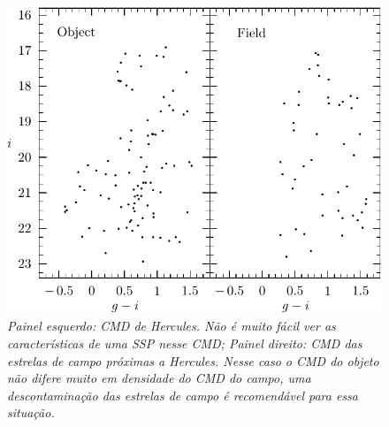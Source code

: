 \documentclass[
	12pt,				%
	openany,			%
	oneside,			%
	a4paper,			%
	english,			%
	brazil				%
	]{abntex2}
\begin{document}
\begin{figure}[H]
\begin{center}
\includegraphics[width=12cm]{figuras/cmdHer_ixgi.pdf}
\caption{\textit{Painel esquerdo: CMD de Hercules. Não é muito fácil ver as características de uma SSP nesse CMD; Painel direito: CMD das estrelas de campo próximas a Hercules. Nesse caso o CMD do objeto não difere muito em densidade do CMD do campo, uma descontaminação das estrelas de campo é recomendável para essa situação. }}
\label{fig:cmdHer}
\end{center}
\end{figure}
\vspace{0.5cm}
\end{document}

